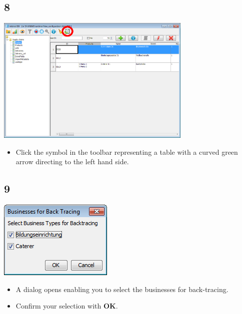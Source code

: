 \documentclass{beamer}
\begin{document}
\subsection{8}
\begin{frame}
	\begin{center}
  		\includegraphics[width=0.7\textwidth]{8.png}
	\end{center}
	\begin{itemize}
		\item Click the symbol in the toolbar representing a table with a curved green arrow directing to the left hand side.
	\end{itemize}
\end{frame}

\subsection{9}
\begin{frame}
	\begin{center}
  		\includegraphics[height=0.5\textheight]{9.png}
	\end{center}
	\begin{itemize}
		\item A dialog opens enabling you to select the businesses for back-tracing.
		\item Confirm your selection with \textbf{OK}.
	\end{itemize}
\end{frame}
\end{document}
